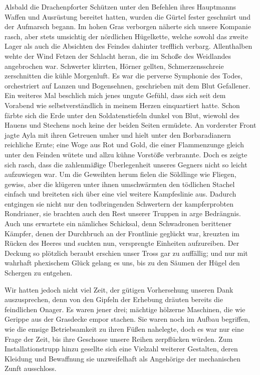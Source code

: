Alsbald die Drachenpforter Schützen unter den Befehlen ihres Hauptmanns Waffen und Ausrüstung bereitet hatten, wurden die Gürtel fester geschnürt und der Aufmarsch begann. Im hohen Gras verborgen näherte sich unsere Kompanie rasch, aber stets umsichtig der nördlichen Hügelkette, welche sowohl das zweite Lager als auch die Absichten des Feindes dahinter trefflich verbarg. Allenthalben wehte der Wind Fetzen der Schlacht heran, die im Schoße des Weidlandes angebrochen war. Schwerter klirrten, Hörner gellten, Schmerzensschreie zerschnitten die kühle Morgenluft. Es war die perverse Symphonie des Todes, orchestriert auf Lanzen und Bogensehnen, geschrieben mit dem Blut Gefallener. Ein weiteres Mal beschlich mich jenes ungute Gefühl, dass sich seit dem Vorabend wie selbstverständlich in meinem Herzen einquartiert hatte. Schon färbte sich die Erde unter den Soldatenstiefeln dunkel von Blut, wiewohl des Hauens und Stechens noch keine der beiden Seiten ermüdete. An vorderster Front jagte Ayla mit ihren Getreuen umher und hielt unter den Borbaradianern reichliche Ernte; eine Woge aus Rot und Gold, die einer Flammenzunge gleich unter den Feinden wütete und allzu kühne Vorstöße verbrannte. Doch es zeigte sich rasch, dass die zahlenmäßige Überlegenheit unseres Gegners nicht so leicht aufzuwiegen war. Um die Geweihten herum fielen die Söldlinge wie Fliegen, gewiss, aber die klügeren unter ihnen umschwärmten den tödlichen Stachel einfach und breiteten sich über eine viel weitere Kampfeslinie aus. Dadurch entgingen sie nicht nur den todbringenden Schwertern der kampferprobten Rondrianer, sie brachten auch den Rest unserer Truppen in arge Bedrängnis. Auch uns erwartete ein nämliches Schicksal, denn Schwadronen berittener Kämpfer, denen der Durchbruch an der Frontlinie geglückt war, kreuzten im Rücken des Heeres und suchten nun, versprengte Einheiten aufzureiben. Der Deckung so plötzlich beraubt erschien unser Tross gar zu auffällig; und nur mit wahrhaft phexischem Glück gelang es uns, bis zu den Säumen der Hügel den Schergen zu entgehen.

Wir hatten jedoch nicht viel Zeit, der gütigen Vorhersehung unseren Dank auszusprechen, denn von den Gipfeln der Erhebung dräuten bereits die feindlichen Onager. Es waren jener drei; mächtige hölzerne Maschinen, die wie Gerippe aus der Grasdecke empor stachen. Sie waren noch im Aufbau begriffen, wie die emsige Betriebsamkeit zu ihren Füßen nahelegte, doch es war nur eine Frage der Zeit, bis ihre Geschosse unsere Reihen zerpflücken würden. Zum Installationstrupp hinzu gesellte sich eine Vielzahl weiterer Gestalten, deren Kleidung und Bewaffnung sie unzweifelhaft als Angehörige der mechanischen Zunft ausschloss.


